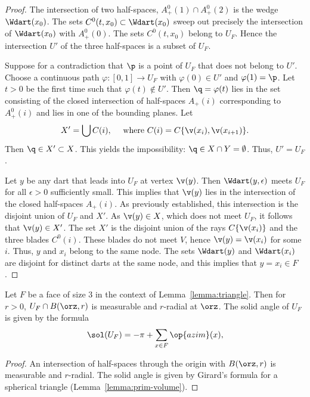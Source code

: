 \begin{proof} The intersection of two half-spaces, $A^0_+(1)\cap A^0_+(2)$ is
the wedge $\Wdart(x_0)$.   The sets $C^0(t,x_0)\subset\Wdart(x_0)$ sweep out precisely
the intersection of $\Wdart(x_0)$ with $A^0_+(0)$.  The sets $C^0(t,x_0)$ belong to
$U_F$.  Hence the intersection $U'$ of the three half-spaces is a subset of $U_F$.

Suppose for a contradiction 
that $\p$ is a point of $U_F$ that does not belong to $U'$.  Choose a continuous path $\varphi:[0,1]\to U_F$ with $\varphi(0)\in U'$ and $\varphi(1)=\p$.  Let $t>0$ be the first time such that $\varphi(t)\not\in U'$.  Then $\q=\varphi(t)$ lies in the set consisting of the closed intersection of half-spaces $A_+(i)$ corresponding to $A^0_+(i)$ and lies
in one of the bounding planes.  Let 
$$
X' = \bigcup C(i),\quad\text{ where } C(i)=C\{\v(x_i),\v(x_{i+1})\}.
$$
Then $\q\in X'\subset X$.  This yields the impossibility:
$\q\in X\cap Y = \emptyset$.   Thus, $U'=U_F$.

Let $y$ be any dart that leads into $U_F$ at vertex $\v(y)$.  Then
$\Wdart(y,\epsilon)$ meets $U_F$ for all $\epsilon>0$ sufficiently small.
This implies that $\v(y)$ lies in the intersection of the closed half-spaces $A_+(i)$.  As previously established, this intersection is the disjoint union of $U_F$ and
$X'$.  As $\v(y)\in X$, which does not meet $U_F$, it follows that $\v(y)\in X'$.
The set $X'$ is the disjoint union of the rays $C\{\v(x_i)\}$ and
the three blades $C^0(i)$.  These blades do not meet $V$, hence
$\v(y)=\v(x_i)$ for some $i$.  Thus, $y$ and $x_i$ belong to the same
node.  The sets $\Wdart(y)$ and $\Wdart( x_i)$ are disjoint for distinct darts at the same
node, and this implies that $y=x_i\in F$.
\end{proof}

\begin{corollary}\label{lemma:girard-component}
Let $F$ be a face of size $3$ in the context of Lemma~\ref{lemma:triangle}.  Then for $r>0$, $U_F \cap B(\orz,r)$ is measurable and $r$-radial at $\orz$.
The solid angle of $U_F$ is given by the formula
$$
\sol(U_F) = -\pi + \sum_{x\in F}\op{azim}(x),
$$
\end{corollary}
%
%
%

\begin{proof} An intersection of half-spaces through the origin 
with $B(\orz,r)$ is measurable and
$r$-radial.  The solid angle is given by Girard's formula for
a spherical triangle (Lemma~\ref{lemma:prim-volume}).
\end{proof}
%

